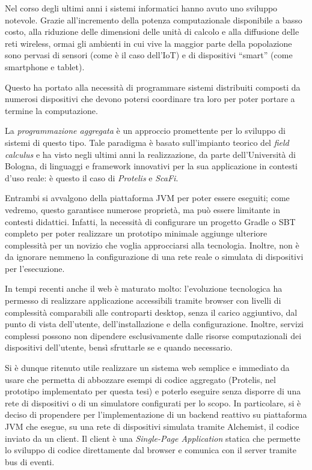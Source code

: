 
Nel corso degli ultimi anni i sistemi informatici hanno avuto uno sviluppo notevole.
Grazie all'incremento della potenza computazionale disponibile a basso costo, alla riduzione delle dimensioni delle unità di calcolo e alla diffusione delle reti wireless,
ormai gli ambienti in cui vive la maggior parte della popolazione sono pervasi di sensori (come è il caso dell'IoT) e di dispositivi ``smart'' (come smartphone e tablet).

Questo ha portato alla necessità di programmare sistemi distribuiti composti da numerosi dispositivi che devono potersi coordinare tra loro
per poter portare a termine la computazione.

La \emph{programmazione aggregata} è un approccio promettente per lo sviluppo di sistemi di questo tipo.
Tale paradigma è basato sull'impianto teorico del \emph{field calculus} e ha visto negli ultimi anni la realizzazione,
da parte dell'Università di Bologna, di linguaggi e framework innovativi per la sua applicazione in contesti d'uso reale:
è questo il caso di \emph{Protelis} e \emph{ScaFi}.

Entrambi si avvalgono della piattaforma JVM per poter essere eseguiti;
come vedremo, questo garantisce numerose proprietà, ma può essere limitante in contesti didattici.
Infatti, la necessità di configurare un progetto Gradle o SBT completo per poter realizzare un prototipo minimale
aggiunge ulteriore complessità per un novizio che voglia approcciarsi alla tecnologia.
Inoltre, non è da ignorare nemmeno la configurazione di una rete reale o simulata di dispositivi per l'esecuzione.

In tempi recenti anche il web è maturato molto:
l'evoluzione tecnologica ha permesso di realizzare applicazione accessibili tramite browser con livelli di complessità comparabili alle controparti desktop,
senza il carico aggiuntivo, dal punto di vista dell'utente, dell'installazione e della configurazione.
Inoltre, servizi complessi possono non dipendere esclusivamente dalle risorse computazionali dei dispositivi dell'utente,
bensì sfruttarle se e quando necessario.

Si è dunque ritenuto utile realizzare un sistema web semplice e immediato da usare che permetta di abbozzare esempi di codice aggregato
(Protelis, nel prototipo implementato per questa tesi) e poterlo eseguire senza disporre di una rete di dispositivi o di un simulatore configurati per lo scopo.
In particolare, si è deciso di propendere per l'implementazione di un backend reattivo su piattaforma JVM che esegue, su una rete di dispositivi simulata tramite Alchemist, il codice inviato da un client.
Il client è una \emph{Single-Page Application} statica che permette lo sviluppo di codice direttamente dal browser e comunica con il server tramite bus di eventi.

